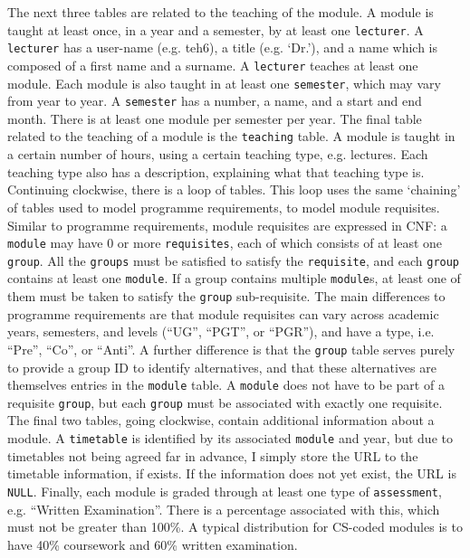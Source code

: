     The next three tables are related to the teaching of the module. A module is
    taught at least once, in a year and a semester, by at least one
    \texttt{lecturer}. A \texttt{lecturer} has a user-name (e.g. teh6), a title
    (e.g. `Dr.'), and a name which is composed of a first name and a surname. A
    \texttt{lecturer} teaches at least one module. Each module is also taught
    in at least one \texttt{semester}, which may vary from year to year. A
    \texttt{semester} has a number, a name, and a start and end month. There is
    at least one module per semester per year. The final table related to the
    teaching of a module is the \texttt{teaching} table. A module is taught in
    a certain number of hours, using a certain teaching type, e.g. lectures.
    Each teaching type also has a description, explaining what that teaching
    type is.
    \\
    
    Continuing clockwise, there is a loop of tables. This loop uses the same
    `chaining' of tables used to model programme requirements, to model module
    requisites. Similar to programme requirements, module requisites are
    expressed in CNF: a \texttt{module} may have 0 or more \texttt{requisites},
    each of which consists of at least one \texttt{group}. All the
    \texttt{groups} must be satisfied to satisfy the \texttt{requisite}, and
    each \texttt{group} contains at least one \texttt{module}. If a group
    contains multiple \texttt{module}s, at least one of them must be taken to
    satisfy the \texttt{group} sub-requisite. The main differences to programme
    requirements are that module requisites can vary across academic years,
    semesters, and levels (``UG'', ``PGT'', or ``PGR''), and have a type, i.e.
    ``Pre'', ``Co'', or ``Anti''. A further difference is that the
    \texttt{group} table serves purely to provide a group ID to identify
    alternatives, and that these alternatives are themselves entries in the
    \texttt{module} table. A \texttt{module} does not have to be part of a
    requisite \texttt{group}, but each \texttt{group} must be associated with
    exactly one requisite.
    \\
    
    The final two tables, going clockwise, contain additional information about
    a module. A \texttt{timetable} is identified by its associated
    \texttt{module} and year, but due to timetables not being agreed far in
    advance, I simply store the URL to the timetable information, if exists. If
    the information does not yet exist, the URL is \texttt{NULL}. Finally, each
    module is graded through at least one type of \texttt{assessment}, e.g.
    ``Written Examination''. There is a percentage associated with this, which
    must not be greater than 100\%. A typical distribution for CS-coded modules
    is to have 40\% coursework and 60\% written examination.
    \\
    
